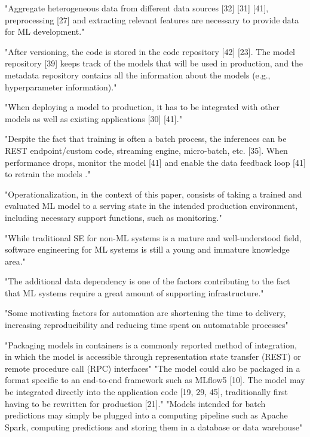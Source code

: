 "Aggregate heterogeneous data from different data sources [32] [31] [41],
preprocessing [27] and extracting relevant features are necessary to provide
data for ML development."

"After versioning, the code is stored in the code repository [42] [23]. The
model repository [39] keeps track of the models that will be used in production,
and the metadata repository contains all the information about the models (e.g.,
hyperparameter information)."

"When deploying a model to production, it has to be integrated with other models
as well as existing applications [30] [41]."

"Despite the fact that training is often a batch process, the inferences can be
REST endpoint/custom code, streaming engine, micro-batch, etc. [35]. When
performance drops, monitor the model [41] and enable the data feedback loop [41]
to retrain the models ."


\parencite{Kolltveit2022OperationalizingReview}


"Operationalization, in the context of this paper, consists of taking a trained
and evaluated ML model to a serving state in the intended production
environment, including necessary support functions, such as monitoring."

"While traditional SE for non-ML systems is a mature and well-understood field,
software engineering for ML systems is still a young and immature knowledge
area."

"The additional data dependency is one of the factors contributing to the fact
that ML systems require a great amount of supporting infrastructure."

"Some motivating factors for automation are shortening the time to delivery,
increasing reproducibility and reducing time spent on automatable processes"

"Packaging models in containers is a commonly reported method of integration, in
which the model is accessible through representation state transfer (REST) or
remote procedure call (RPC) interfaces"
"The model could also be packaged in a format specific to an end-to-end
framework such as MLflow5 [10]. The model may be integrated directly into the
application code [19, 29, 45], traditionally first having to be rewritten for
production [21]."
"Models intended for batch predictions may simply be plugged into a computing
pipeline such as Apache Spark, computing predictions and storing them in a
database or data warehouse"

